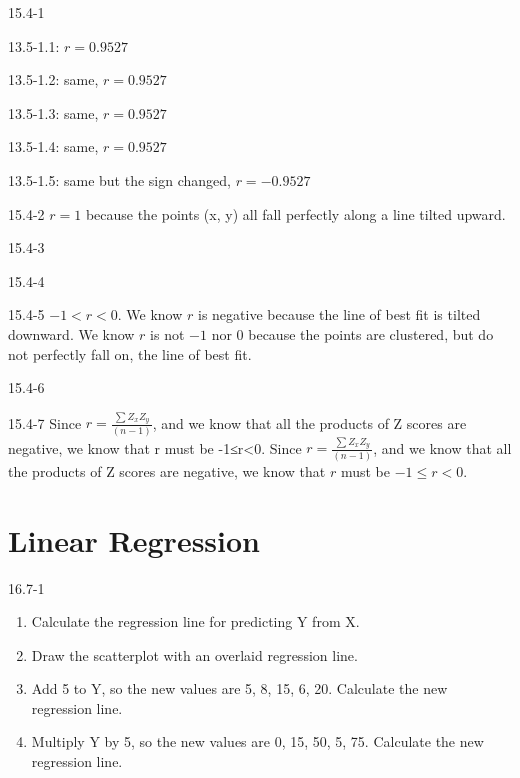 \begin{exsol@solution}{15.4-1}


13.5-1.1: $r = 0.9527 $

13.5-1.2: same, $r = 0.9527 $

13.5-1.3: same, $r = 0.9527 $

13.5-1.4: same, $r = 0.9527 $

13.5-1.5: same but the sign changed, $r = -0.9527 $

\end{exsol@solution}
\begin{exsol@solution}{15.4-2}
$r = 1$ because the points (x, y) all fall perfectly along a line tilted upward.

\end{exsol@solution}
\begin{exsol@solution}{15.4-3}
\end{exsol@solution}
\begin{exsol@solution}{15.4-4}

\end{exsol@solution}
\begin{exsol@solution}{15.4-5}
$ -1 < r < 0$. We know $r$ is negative because the line of best fit is tilted downward. We know $r$ is not $-1$ nor $0$ because the points are clustered, but do not perfectly fall on, the line of best fit.

\end{exsol@solution}
\begin{exsol@solution}{15.4-6}
\end{exsol@solution}
\begin{exsol@solution}{15.4-7}
Since $ r = \frac{ \sum Z_x Z_y}{(n - 1)}$, and we know that all the products of Z scores are negative, we know that r must be -1≤r<0. Since $ r = \frac{ \sum Z_x Z_y}{(n - 1)}$, and we know that all the products of Z scores are negative, we know that $r$ must be $-1 \le r < 0$.
\end{exsol@solution}
\setcounter{chapter}{15}\chapter{Linear Regression}
\begin{exsol@solution}{16.7-1}
\begin{enumerate}
  \item Calculate the regression line for predicting Y from X.
  \item Draw the scatterplot with an overlaid regression line.
  \item Add 5 to Y, so the new values are 5, 8, 15, 6, 20.  Calculate the new regression line.
  \item Multiply Y by 5, so the new values are 0, 15, 50, 5, 75.  Calculate the new regression line.
\end{enumerate}

\end{exsol@solution}
